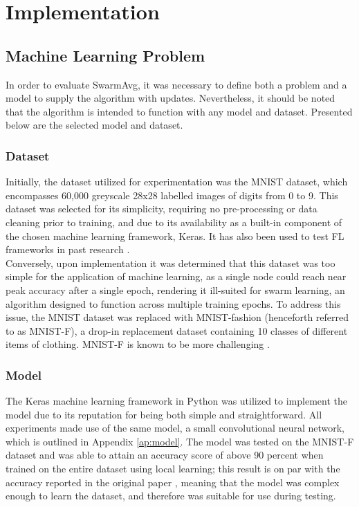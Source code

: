 \chapter{Implementation}
\section{Machine Learning Problem}
In order to evaluate SwarmAvg, it was necessary to define both a problem and a model to supply the algorithm with updates. Nevertheless, it should be noted that the algorithm is intended to function with any model and dataset. Presented below are the selected model and dataset.

\subsection{Dataset}
Initially, the dataset utilized for experimentation was the MNIST dataset, which encompasses 60,000 greyscale 28x28 labelled images of digits from 0 to 9. This dataset was selected for its simplicity, requiring no pre-processing or data cleaning prior to training, and due to its availability as a built-in component of the chosen machine learning framework, Keras. It has also been used to test FL frameworks in past research \cite{leaderelec_car}. \\

Conversely, upon implementation it was determined that this dataset was too simple for the application of machine learning, as a single node could reach near peak accuracy after a single epoch, rendering it ill-suited for swarm learning, an algorithm designed to function across multiple training epochs.  To address this issue, the MNIST dataset was replaced with MNIST-fashion (henceforth referred to as MNIST-F), a drop-in replacement dataset containing 10 classes of different items of clothing. MNIST-F is known to be more challenging \cite{xiao2017fashionmnist}.

\subsection{Model}
The Keras machine learning framework in Python was utilized to implement the model due to its reputation for being both simple and straightforward. All experiments made use of the same model, a small convolutional neural network, which is outlined in Appendix \ref{ap:model}. The model was tested on the MNIST-F dataset and was able to attain an accuracy score of above 90 percent when trained on the entire dataset using local learning; this result is on par with the accuracy reported in the original paper \cite{xiao2017fashionmnist}, meaning that the model was complex enough to learn the dataset, and therefore was suitable for use during testing.


